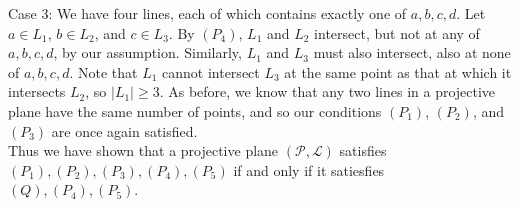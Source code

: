 \documentclass{article}
\begin{document}
\newline
Case 3: We have four lines, each of which contains exactly one of $a,b,c,d$.
Let $a\in L_1$, $b\in L_2$, and $c\in L_3$. By $(P_4)$, $L_1$ and $L_2$
intersect, but not at any of $a,b,c,d$, by our assumption. Similarly, $L_1$ and
$L_3$ must also intersect, also at none of $a,b,c,d$. Note that $L_1$ cannot
intersect $L_3$ at the same point as that at which it intersects $L_2$, so
$|L_1|\ge3$. As before, we know that any two lines in a projective plane have
the same number of points, and so our conditions $(P_1)$, $(P_2)$, and $(P_3)$
are once again satisfied.\\
\newline
Thus we have shown that a projective plane $(\mathcal{P},\mathcal{L})$ satisfies
$(P_1),(P_2),(P_3),(P_4),(P_5)$ if and only if it satiesfies $(Q),(P_4),(P_5)$.
\end{document}
